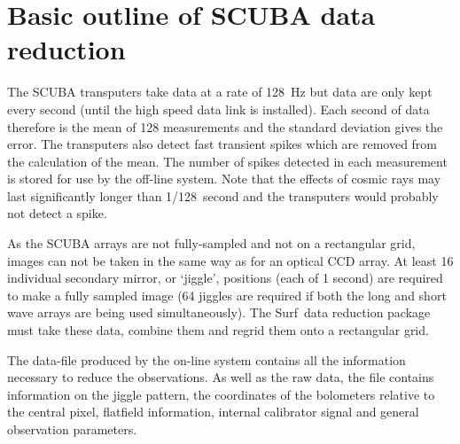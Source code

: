 \documentclass[twoside,11pt]{article}
\newcommand{\scusoft}          {{\sc Surf}}
\newcommand{\xlabel}[1]{}
\renewcommand{\_}{\texttt{\symbol{95}}}
\begin{document}
\section{\xlabel{outline}Basic outline of SCUBA data reduction\label{outline}}

The SCUBA transputers take data at a rate of 128~Hz but data are only kept
every second (until the high speed data link is installed). Each second of
data therefore is the mean of 128 measurements and the standard deviation
gives the error. The transputers also detect fast transient spikes which are
removed from the calculation of the mean. The number of spikes detected in
each measurement is stored for use by the off-line system. Note that the
effects of cosmic rays may last significantly longer than 1/128~second and the
transputers would probably not detect a spike.

As the SCUBA arrays are not fully-sampled and not on a rectangular grid, images
can not be taken in the same way as for an optical CCD array. At least 16
individual secondary mirror, or `jiggle', positions (each of 1 second) are
required to make a fully sampled image (64 jiggles are required if both the
long and short wave arrays are being used simultaneously). The \scusoft\ data
reduction package must take these data, combine them and regrid them onto a
rectangular grid.

The data-file produced by the on-line system contains all the information
necessary to reduce the observations. As well as the raw data, the file
contains information on the jiggle pattern, the coordinates of the
bolometers relative to the central pixel, flatfield information, internal
calibrator signal and general observation parameters.
\end{document}
